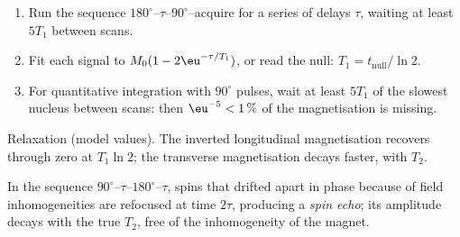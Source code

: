 \begin{method}\label{met:b3:advanced-nmr:t1}
\begin{enumerate}
  \item Run the sequence $180^\circ$--$\tau$--$90^\circ$--acquire for a series of delays
        $\tau$, waiting at least $5T_1$ between scans.
  \item Fit each signal to $M_0(1 - 2\eu^{-\tau/T_1})$, or read the null: $T_1 =
        t_{\mathrm{null}}/\ln2$.
  \item For quantitative integration with $90^\circ$ pulses, wait at least $5T_1$ of the
        slowest nucleus between scans: then $\eu^{-5} < 1\,\%$ of the magnetisation is
        missing.
\end{enumerate}
\end{method}

\begin{omfigure}

{\small Relaxation (model values). The inverted longitudinal magnetisation
recovers through zero at $T_1\ln2$; the transverse magnetisation decays
faster, with $T_2$.}
\end{omfigure}

\begin{definition}\label{def:b3:advanced-nmr:echo}
In the sequence $90^\circ$--$\tau$--$180^\circ$--$\tau$, spins that drifted apart in phase
because of field inhomogeneities are refocused at time $2\tau$, producing a
\emph{spin echo}; its amplitude decays with the true $T_2$, free of
the inhomogeneity of the magnet.
\end{definition}

